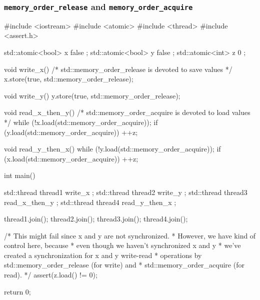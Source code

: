 \documentclass[../main]{subfiles}
\begin{document}
\subsubsection{\texttt{memory\_order\_release} and \texttt{memory\_order\_acquire}}
\begin{Code}
    #include <iostream>
    #include <atomic>
    #include <thread>
    #include <assert.h>

    std::atomic<bool> x{ false };
    std::atomic<bool> y{ false };
    std::atomic<int> z{ 0 };

    void write_x()
    {
        /* std::memory_order_release is devoted to save values */
        x.store(true, std::memory_order_release);
    }

    void write_y()
    {
        y.store(true, std::memory_order_release);
    }

    void read_x_then_y()
    {
        /* std::memory_order_acquire is devoted to load values */
        while (!x.load(std::memory_order_acquire));
        if (y.load(std::memory_order_acquire))
        {
            ++z;
        }
    }

    void read_y_then_x()
    {
        while (!y.load(std::memory_order_acquire));
        if (x.load(std::memory_order_acquire))
        {
            ++z;
        }
    }

    int main()
    {
        std::thread thread1{ write_x };
        std::thread thread2{ write_y };
        std::thread thread3{ read_x_then_y };
        std::thread thread4{ read_y_then_x };

        thread1.join();
        thread2.join();
        thread3.join();
        thread4.join();

        /* This might fail since x and y are not synchronized.
         * However, we have kind of control here, because
         * even though we haven't synchronized x and y
         * we've created a synchronization for x and y write-read
         * operations by std::memory_order_release (for write) and
         * std::memory_order_acquire (for read).
         */
        assert(z.load() != 0);

        return 0;
    }
\end{Code}
\end{document}
